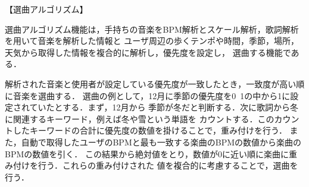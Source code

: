 【選曲アルゴリズム】
\par
選曲アルゴリズム機能は，手持ちの音楽をBPM解析とスケール解析，歌詞解析を用いて音楽を解析した情報と
ユーザ周辺の歩くテンポや時間，季節，場所，天気から取得した情報を複合的に解析し，優先度を設定し，
選曲する機能である．

\par
解析された音楽と使用者が設定している優先度が一致したとき，一致度が高い順に音楽を選曲する．
選曲の例として，12月に季節の優先度を0~1の中から1に設定されていたとする．まず，12月から
季節が冬だと判断する．次に歌詞から冬に関連するキーワード，例えば冬や雪という単語を
カウントする．このカウントしたキーワードの合計に優先度の数値を掛けることで，重み付けを行う．
また，自動で取得したユーザのBPMと最も一致する楽曲のBPMの数値から楽曲のBPMの数値を引く．
この結果から絶対値をとり，数値が0に近い順に楽曲に重み付けを行う．これらの重み付けされた
値を複合的に考慮することで，選曲を行う．

